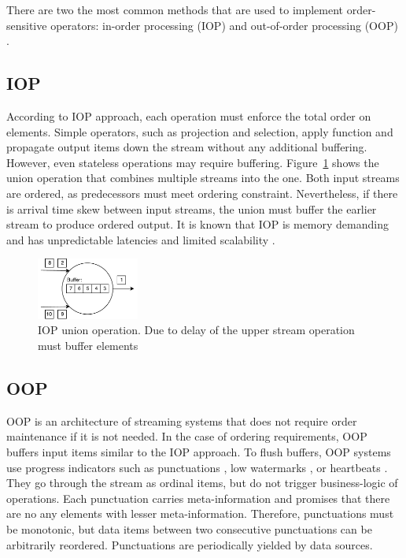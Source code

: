 
\label {fs-typical}

There are two the most common methods that are used to implement order-sensitive operators: in-order processing (IOP) \cite{Arasu:2006:CCQ:1146461.1146463, Cranor:2003:GSD:872757.872838, hammad2004optimizing} and out-of-order processing (OOP) \cite{Li:2008:OPN:1453856.1453890}.

\subsection{IOP}

According to IOP approach, each operation must enforce the total order on elements. Simple operators, such as projection and selection, apply function and propagate output items down the stream without any additional buffering. However, even stateless operations may require buffering. Figure~\ref{iop} shows the union operation that combines multiple streams into the one. Both input streams are ordered, as predecessors must meet ordering constraint. Nevertheless, if there is arrival time skew between input streams, the union must buffer the earlier stream to produce ordered output. It is known that IOP is memory demanding and has unpredictable latencies and limited scalability \cite{Li:2008:OPN:1453856.1453890}.

\begin{figure}[htbp]
  \centering
  \includegraphics[width=0.30\textwidth]{pics/iop}
  \caption{IOP union operation. Due to delay of the upper stream operation must buffer elements}
  \label {iop}
\end{figure}

\subsection{OOP}

OOP is an architecture of streaming systems that does not require order maintenance if it is not needed. In the case of ordering requirements, OOP buffers input items similar to the IOP approach. To flush buffers, OOP systems use progress indicators such as punctuations \cite{Tucker:2003:EPS:776752.776780}, low watermarks \cite{Akidau:2013:MFS:2536222.2536229}, or heartbeats \cite{Srivastava:2004:FTM:1055558.1055596}. They go through the stream as ordinal items, but do not trigger business-logic of operations. Each punctuation carries meta-information and promises that there are no any elements with lesser meta-information. Therefore, punctuations must be monotonic, but data items between two consecutive punctuations can be arbitrarily reordered. Punctuations are periodically yielded by data sources.

